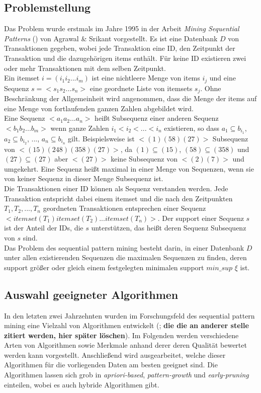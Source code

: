 \subsection{Problemstellung}
Das Problem wurde erstmals im Jahre 1995 in der Arbeit \textit{Mining Sequential Patterns} (\cite{aprioriall}) von Agrawal \& Srikant vorgestellt. Es ist eine Datenbank $D$ von Transaktionen gegeben, wobei jede Transaktion eine ID, den Zeitpunkt der Transaktion und die dazugehörigen items enthält. Für keine ID existieren zwei oder mehr Transaktionen mit dem selben Zeitpunkt.\\
Ein itemset $i=(i_1i_2...i_m)$ ist eine nichtleere Menge von items $i_j$ und eine Sequenz $s=<s_1s_2...s_n>$ eine geordnete Liste von itemsets $s_j$. Ohne Beschränkung der Allgemeinheit wird angenommen, dass die Menge der items auf eine Menge von fortlaufenden ganzen Zahlen abgebildet wird.\\
Eine Sequenz $<a_1a_2...a_n>$ heißt Subsequenz einer anderen Sequenz $<b_1b_2...b_m>$ wenn ganze Zahlen $i_1<i_2<...<i_n$ existieren, so dass $a_1\subseteq b_{i_1}$, $a_2\subseteq b_{i_2}$, ..., $a_n\subseteq b_{i_n}$ gilt. Beispielsweise ist $<(1)(58)(27)>$ Subsequenz von $<(15)(248)(358)(27)>$, da $(1)\subseteq(15)$, $(58)\subseteq(358)$ und $(27)\subseteq(27)$ aber $<(27)>$ keine Subsequenz von $<(2)(7)>$ und umgekehrt. Eine Sequenz heißt maximal in einer Menge von Sequenzen, wenn sie von keiner Sequenz in dieser Menge Subsequenz ist.\\
Die Transaktionen einer ID können als Sequenz verstanden werden. Jede Transaktion entspricht dabei einem itemset und die nach den Zeitpunkten $T_1,T_2,...,T_n$ geordneten Transaktionen entsprechen einer Sequenz $<itemset(T_1)itemset(T_2)...itemset(T_n)>$. Der support einer Sequenz $s$ ist der Anteil der IDs, die $s$ unterstützen, das heißt deren Sequenz Subsequenz von $s$ sind.\\
Das Problem des sequential pattern mining besteht darin, in einer Datenbank $D$ unter allen existierenden Sequenzen die maximalen Sequenzen zu finden, deren support größer oder gleich einem festgelegten minimalen support $min\_sup$ $\xi$ ist.

\subsection{Auswahl geeigneter Algorithmen}

In den letzten zwei Jahrzehnten wurden im Forschungsfeld des sequential pattern mining eine Vielzahl von Algorithmen entwickelt (\cite{hvsm,lapin,aprioriall,gsp,psp,spam,freespan,prefixspan,wapmine,fsminer,discall,spade,plwap}; \textbf{die die an anderer stelle zitiert werden, hier später löschen}). Im Folgenden werden verschiedene Arten von Algorithmen sowie Merkmale anhand derer deren Qualität bewertet werden kann vorgestellt. Anschließend wird ausgearbeitet, welche dieser Algorithmen für die vorliegenden Daten am besten geeignet sind. Die Algorithmen lassen sich grob in \textit{apriori-based}, \textit{pattern-growth} und \textit{early-pruning} einteilen, wobei es auch hybride Algorithmen gibt.\\

